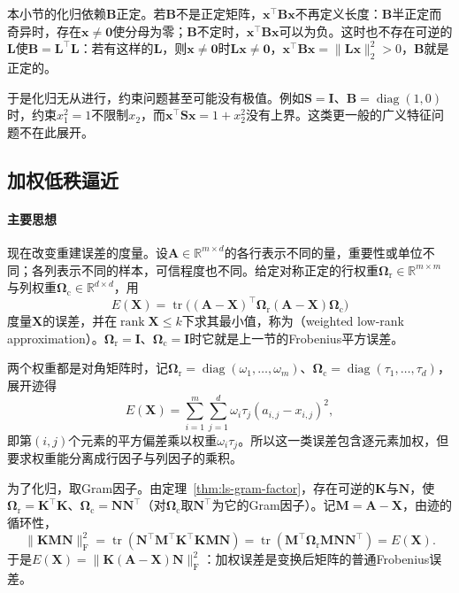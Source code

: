 本小节的化归依赖$\bm B$正定。若$\bm B$不是正定矩阵，$\bm x^\top\bm B\bm x$不再定义长度：$\bm B$半正定而奇异时，存在$\bm x\neq\bm0$使分母为零；$\bm B$不定时，$\bm x^\top\bm B\bm x$可以为负。这时也不存在可逆的$\bm L$使$\bm B=\bm L^\top\bm L$：若有这样的$\bm L$，则$\bm x\neq\bm0$时$\bm L\bm x\neq\bm0$，$\bm x^\top\bm B\bm x=\lVert\bm L\bm x\rVert_2^2>0$，$\bm B$就是正定的。

于是化归无从进行，约束问题甚至可能没有极值。例如$\bm S=\bm I$、$\bm B=\operatorname{diag}(1,0)$时，约束$x_1^2=1$不限制$x_2$，而$\bm x^\top\bm S\bm x=1+x_2^2$没有上界。这类更一般的广义特征问题不在此展开。

\subsection{加权低秩逼近}
\label{sec:matrix-approximation-weighted-low-rank}

\paragraph{主要思想}

现在改变重建误差的度量。设$\bm A\in\mathbb R^{m\times d}$的各行表示不同的量，重要性或单位不同；各列表示不同的样本，可信程度也不同。给定对称正定的行权重$\bm\Omega_{\mathrm r}\in\mathbb R^{m\times m}$与列权重$\bm\Omega_{\mathrm c}\in\mathbb R^{d\times d}$，用
\[
 E(\bm X)=\operatorname{tr}\bigl((\bm A-\bm X)^\top\bm\Omega_{\mathrm r}(\bm A-\bm X)\bm\Omega_{\mathrm c}\bigr)
\]
度量$\bm X$的误差，并在$\operatorname{rank}\bm X\leq k$下求其最小值，称为（weighted low-rank approximation）。$\bm\Omega_{\mathrm r}=\bm I$、$\bm\Omega_{\mathrm c}=\bm I$时它就是上一节的Frobenius平方误差。

两个权重都是对角矩阵时，记$\bm\Omega_{\mathrm r}=\operatorname{diag}(\omega_1,\ldots,\omega_m)$、$\bm\Omega_{\mathrm c}=\operatorname{diag}(\tau_1,\ldots,\tau_d)$，展开迹得
\[
 E(\bm X)=\sum_{i=1}^m\sum_{j=1}^d\omega_i\tau_j(a_{i,j}-x_{i,j})^2 ,
\]
即第$(i,j)$个元素的平方偏差乘以权重$\omega_i\tau_j$。所以这一类误差包含逐元素加权，但要求权重能分离成行因子与列因子的乘积。

为了化归，取Gram因子。由定理~\ref{thm:ls-gram-factor}，存在可逆的$\bm K$与$\bm N$，使$\bm\Omega_{\mathrm r}=\bm K^\top\bm K$、$\bm\Omega_{\mathrm c}=\bm N\bm N^\top$（对$\bm\Omega_{\mathrm c}$取$\bm N^\top$为它的Gram因子）。记$\bm M=\bm A-\bm X$，由迹的循环性，
\[
 \lVert\bm K\bm M\bm N\rVert_{\mathrm F}^2
 =\operatorname{tr}(\bm N^\top\bm M^\top\bm K^\top\bm K\bm M\bm N)
 =\operatorname{tr}(\bm M^\top\bm\Omega_{\mathrm r}\bm M\bm N\bm N^\top)
 =E(\bm X).
\]
于是$E(\bm X)=\lVert\bm K(\bm A-\bm X)\bm N\rVert_{\mathrm F}^2$：加权误差是变换后矩阵的普通Frobenius误差。

